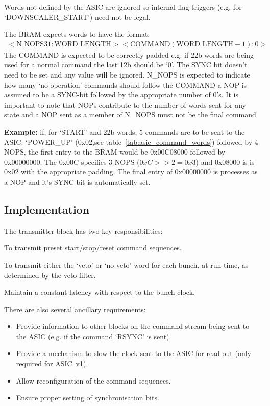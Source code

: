 \documentclass[]{article}
\begin{document}
    Words not defined by the ASIC are ignored so internal flag triggers (e.g. for `DOWNSCALER\_START') need not be legal.

    The BRAM expects words to have the format:
    \begin{align}\label{fmt:tx_bram}
        <\text{N\_NOPS} 31:\text{WORD\_LENGTH}><\text{COMMAND} (\text{WORD\_LENGTH} - 1):0>
    \end{align}
    The COMMAND is expected to be correctly padded e.g. if 22b words are being used for a normal command the last 12b should be `0'. The SYNC bit doesn't need to be set and any value will be ignored. N\_NOPS is expected to indicate how many `no-operation' commands should follow the COMMAND a NOP is assumed to be a SYNC-bit followed by the appropriate number of 0's. It is important to note that NOPs contribute to the number of words sent for any state and a NOP sent as a member of N\_NOPS must not be the final command

    \textbf{Example:} if, for `START' and 22b words, 5 commands are to be sent to the ASIC: `POWER\_UP' (0x02,see table~\ref{tab:asic_command_words}) followed by 4 NOPS, the first entry to the BRAM would be 0x00C08000 followed by 0x00000000. The 0x00C specifies 3 NOPS (\(0xC>>2 = 0x3\)) and 0x08000 is is 0x02 with the appropriate padding. The final entry of 0x00000000 is processes as a NOP and it's SYNC bit is automatically set.
    \subsection{Implementation} %
    \label{sub:tx_implementation}
    
    The transmitter block has two key responsibilities:
    \begin{itemize*}
        \item To transmit preset start/stop/reset command sequences. 
        \item To transmit either the `veto' or `no-veto' word for each bunch, at run-time, as determined by the veto filter.
        \item Maintain a constant latency with respect to the bunch clock. 
    \end{itemize*}
    There are also several ancillary requirements:
    \begin{itemize}
        \item Provide information to other blocks on the command stream being sent to the ASIC (e.g. if the command `RSYNC' is sent).
        \item Provide a mechanism to slow the clock sent to the ASIC for read-out (only required for ASIC~v1).
        \item Allow reconfiguration of the command sequences.
        \item Ensure proper setting of synchronisation bits.
    \end{itemize}
    
\end{document}
